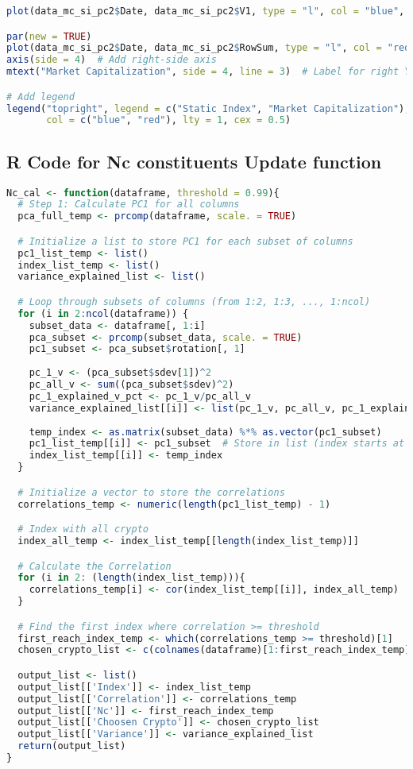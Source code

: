 \documentclass[12pt]{article}
\begin{document}
\begin{lstlisting}[language=R, caption={SI}]
plot(data_mc_si_pc2$Date, data_mc_si_pc2$V1, type = "l", col = "blue", xlab = "Date", ylab = "Static Index")

par(new = TRUE)
plot(data_mc_si_pc2$Date, data_mc_si_pc2$RowSum, type = "l", col = "red", axes = FALSE, xlab = "", ylab = "")
axis(side = 4)  # Add right-side axis
mtext("Market Capitalization", side = 4, line = 3)  # Label for right Y-axis

# Add legend
legend("topright", legend = c("Static Index", "Market Capitalization"),
       col = c("blue", "red"), lty = 1, cex = 0.5)

\end{lstlisting}


\subsection*{R Code for Nc constituents Update function}
\begin{lstlisting}[language=R, caption={NC}]
Nc_cal <- function(dataframe, threshold = 0.99){
  # Step 1: Calculate PC1 for all columns
  pca_full_temp <- prcomp(dataframe, scale. = TRUE)

  # Initialize a list to store PC1 for each subset of columns
  pc1_list_temp <- list()
  index_list_temp <- list()
  variance_explained_list <- list()

  # Loop through subsets of columns (from 1:2, 1:3, ..., 1:ncol)
  for (i in 2:ncol(dataframe)) {
    subset_data <- dataframe[, 1:i]
    pca_subset <- prcomp(subset_data, scale. = TRUE)
    pc1_subset <- pca_subset$rotation[, 1]
    
    pc_1_v <- (pca_subset$sdev[1])^2
    pc_all_v <- sum((pca_subset$sdev)^2)
    pc_1_explained_v_pct <- pc_1_v/pc_all_v
    variance_explained_list[[i]] <- list(pc_1_v, pc_all_v, pc_1_explained_v_pct)
    
    temp_index <- as.matrix(subset_data) %*% as.vector(pc1_subset)
    pc1_list_temp[[i]] <- pc1_subset  # Store in list (index starts at 1)
    index_list_temp[[i]] <- temp_index
  }

  # Initialize a vector to store the correlations
  correlations_temp <- numeric(length(pc1_list_temp) - 1)

  # Index with all crypto
  index_all_temp <- index_list_temp[[length(index_list_temp)]]

  # Calculate the Correlation
  for (i in 2: (length(index_list_temp))){
    correlations_temp[i] <- cor(index_list_temp[[i]], index_all_temp)
  }

  # Find the first index where correlation >= threshold
  first_reach_index_temp <- which(correlations_temp >= threshold)[1]
  chosen_crypto_list <- c(colnames(dataframe)[1:first_reach_index_temp])

  output_list <- list()
  output_list[['Index']] <- index_list_temp
  output_list[['Correlation']] <- correlations_temp
  output_list[['Nc']] <- first_reach_index_temp
  output_list[['Choosen Crypto']] <- chosen_crypto_list
  output_list[['Variance']] <- variance_explained_list
  return(output_list)
}
\end{lstlisting}
\end{document}
